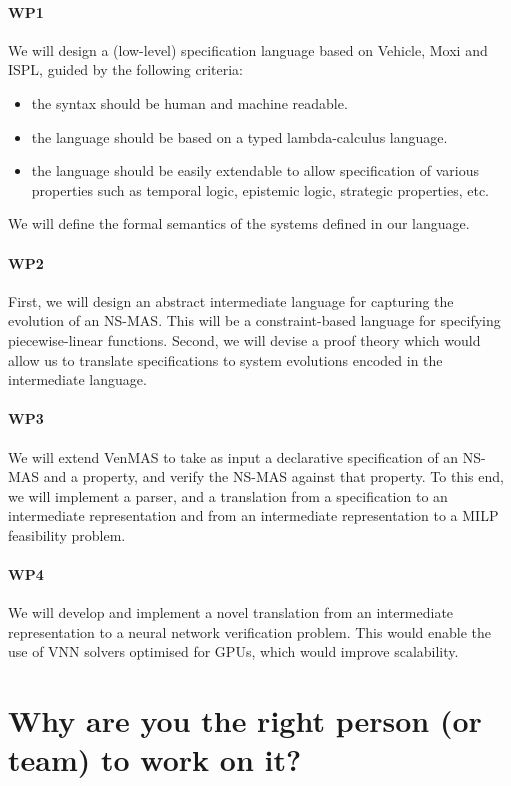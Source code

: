 \documentclass[11pt]{article}
\begin{document}
\paragraph{WP1} We will design a (low-level) specification language
based on Vehicle, Moxi and ISPL, guided by the following criteria:
\begin{itemize}
\item the syntax should be human and machine readable.  
\item the language should be based on a typed lambda-calculus language.
\item the language should be easily extendable to allow specification
  of various properties such as temporal logic, epistemic logic,
  strategic properties, etc.
\end{itemize}
We will define the formal semantics of the systems defined in our language.

\paragraph{WP2}  First, we will design an abstract intermediate language
for capturing the evolution of an NS-MAS. This will be a
constraint-based language for specifying piecewise-linear
functions. Second, we will devise a proof theory which would allow us
to translate specifications to system evolutions encoded in the
intermediate language.

\paragraph{WP3}  We will extend VenMAS to take as input a declarative
specification of an NS-MAS and a property, and verify the NS-MAS
against that property. To this end, we will implement a parser, and a
translation from a specification to an intermediate representation
and from an intermediate representation to a MILP feasibility problem.

\paragraph{WP4} We will develop and implement a novel translation from
an intermediate representation to a neural network verification
problem. This would enable the use of VNN solvers optimised for GPUs,
which would improve scalability.

\section{Why are you the right person (or
team) to work on it?}
\end{document}
